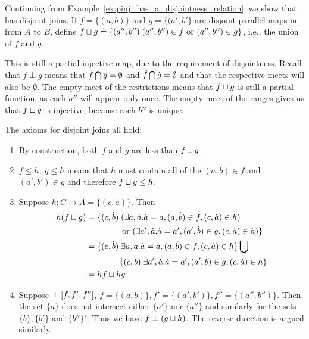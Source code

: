 \begin{example}\label{ex:pinj_has_a_disjoint_join}
  Continuing from Example~\ref{ex:pinj_has_a_disjointness_relation}, we show that \pinj has disjoint
  joins. If $f = \{(a,b)\}$ and $g=\{(a',b'\}$ are disjoint parallel maps in \pinj from $A$ to $B$,
  define $f\sqcup g \doteq \{(a'',b'') | (a'',b'') \in f\text{ or }(a'',b'') \in g\}$, i.e., the
  union of $f$ and $g$.

  This is still a partial injective map, due to the requirement of disjointness. Recall that $f\perp
  g$ means that $\overline{f}\bigcap \overline{g} = \emptyset$ and $\hat{f}\bigcap\hat{g} =
  \emptyset$ and that the respective meets will also be $\emptyset$. The empty meet of the
  restrictions means that $f\sqcup g$ is still a partial function,  as each $a''$ will appear only
  once. The empty meet of the ranges gives us that $f\sqcup g$ is injective, because each $b''$ is
  unique.

  The axioms for disjoint joins all hold:
  \begin{enumerate}
    \item[\axiom{DJ}{1}] By construction, both $f$ and $g$ are less than $f\sqcup g$.
    \item[\axiom{DJ}{2}] $f \le h,\ g \le h$ means that $h$ must contain all of the $(a,b)\in f$ and
      $(a',b') \in g$ and therefore $f\sqcup g \le h$.
    \item[\axiom{DJ}{3}] Suppose $h:C\to A = \{(c,\dot{a})\}$. Then
      \begin{align*}
        h(f \sqcup g) &= \{(c,\dot{b}) |(\exists a,\dot{a}.\dot{a} = a, (a,\dot{b}) \in f,
        (c,\dot{a}) \in h) \\
        & \qquad\qquad \text{ or }(\exists a',\dot{a}.\dot{a} = a', (a',\dot{b}) \in g, (c,\dot{a}) \in h)\}\\
        & = \{(c,\dot{b}) |\exists a, \dot{a}.\dot{a} = a, (a,\dot{b}) \in f, (c,\dot{a}) \in h\} \bigcup\\
        & \qquad\qquad\{(c,\dot{b}) | \exists a',\dot{a}.\dot{a} = a', (a',\dot{b}) \in g, (c,\dot{a}) \in h\}\\
        &= h f \sqcup hg
      \end{align*}
    \item[\axiom{DJ}{4}] Suppose $\perp [f, f', f'']$, $f=\{(a,b)\}, f'=\{(a',b')\},
      f''=\{(a'',b'')\}$. Then the set $\{a\}$ does not intersect either $\{a'\}$ nor $\{a''\}$ and
      similarly for the sets $\{b\}, \{b'\}$ and $\{b''\}'$. Thus we have $f \perp (g\sqcup h)$. The
      reverse direction is argued similarly.
  \end{enumerate}
\end{example}

